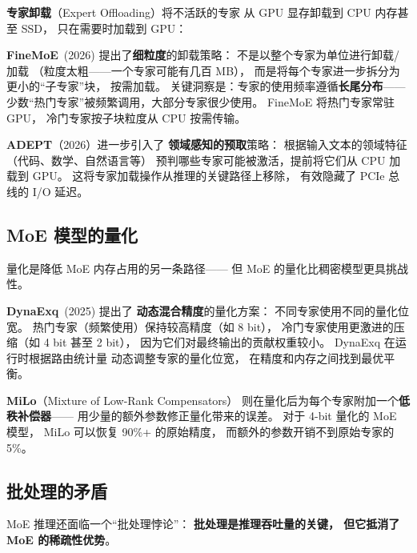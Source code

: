\textbf{专家卸载}（Expert Offloading）将不活跃的专家
从 GPU 显存卸载到 CPU 内存甚至 SSD，
只在需要时加载到 GPU：

\textbf{FineMoE}~(2026) 提出了\textbf{细粒度}的卸载策略：%
不是以整个专家为单位进行卸载/加载
（粒度太粗——一个专家可能有几百 MB），
而是将每个专家进一步拆分为更小的``子专家''块，
按需加载。
关键洞察是：专家的使用频率遵循\textbf{长尾分布}——
少数``热门专家''被频繁调用，大部分专家很少使用。
FineMoE 将热门专家常驻 GPU，
冷门专家按子块粒度从 CPU 按需传输。

\textbf{ADEPT}（2026）进一步引入了%
\textbf{领域感知的预取}策略：
根据输入文本的领域特征（代码、数学、自然语言等）
预判哪些专家可能被激活，提前将它们从 CPU 加载到 GPU。
这将专家加载操作从推理的关键路径上移除，
有效隐藏了 PCIe 总线的 I/O 延迟。

\subsection{MoE 模型的量化}

量化是降低 MoE 内存占用的另一条路径——
但 MoE 的量化比稠密模型更具挑战性。

\textbf{DynaExq}~(2025) 提出了%
\textbf{动态混合精度}的量化方案：
不同专家使用不同的量化位宽。
热门专家（频繁使用）保持较高精度（如 8 bit），
冷门专家使用更激进的压缩（如 4 bit 甚至 2 bit），
因为它们对最终输出的贡献权重较小。
DynaExq 在运行时根据路由统计量
动态调整专家的量化位宽，
在精度和内存之间找到最优平衡。

\textbf{MiLo}（Mixture of Low-Rank Compensators）%
则在量化后为每个专家附加一个\textbf{低秩补偿器}——
用少量的额外参数修正量化带来的误差。
对于 4-bit 量化的 MoE 模型，
MiLo 可以恢复 90\%+ 的原始精度，
而额外的参数开销不到原始专家的 5\%。

\subsection{批处理的矛盾}

MoE 推理还面临一个``批处理悖论''：
\textbf{批处理是推理吞吐量的关键，
但它抵消了 MoE 的稀疏性优势}。

